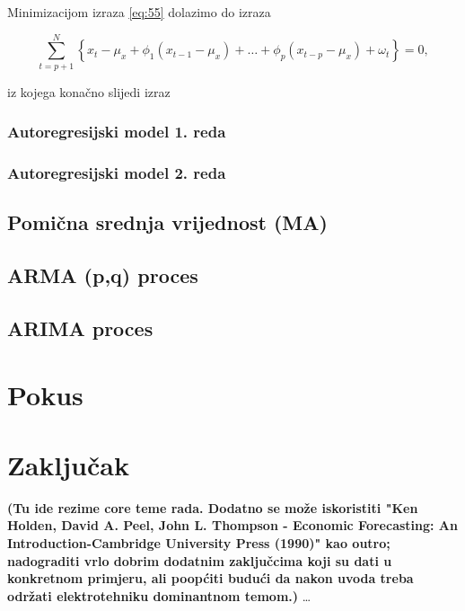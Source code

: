 \documentclass[a4paper,12pt,oneside]{memoir}
\begin{document}
            Minimizacijom izraza \ref{eq:55} dolazimo do izraza
            
            \begin{equation}
                \displaystyle\sum_{t=p+1}^N\left\{x_t-\mu_x+\phi_1\left(x_{t-1}-\mu_x\right)+\ldots+\phi_p\left(x_{t-p}-\mu_x\right)+\omega_t\right\}=0,
            \end{equation}
            \label{subs:511}

            iz kojega konačno slijedi izraz


            \subsection{Autoregresijski model 1. reda}
            \label{subs:512}
            \subsection{Autoregresijski model 2. reda}
            \label{subs:513}




        \section{Pomična srednja vrijednost (MA)}

        \section{ARMA (p,q) proces}
        \section{ARIMA proces}
    \chapter{Pokus}
    \chapter{Zaključak}
        \textbf{(Tu ide rezime core teme rada. Dodatno se može iskoristiti "Ken Holden, David A. Peel, John L. Thompson - Economic Forecasting: An Introduction-Cambridge University Press (1990)" kao outro; nadograditi vrlo dobrim dodatnim zaključcima koji su dati u konkretnom primjeru, ali poopćiti budući da nakon uvoda treba održati elektrotehniku dominantnom temom.)} %
        \ldots{}
\end{document}
